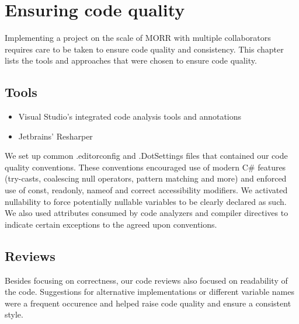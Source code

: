 \chapter{Ensuring code quality}

Implementing a project on the scale of MORR with multiple collaborators requires care to be taken to ensure code quality and consistency. This chapter lists the tools and approaches that were chosen to ensure code quality.

\section{Tools}

\begin{itemize}
    \item Visual Studio's integrated code analysis tools and annotations
    \item Jetbrains' Resharper
\end{itemize}

We set up common .editorconfig and .DotSettings files that contained our code quality conventions. These conventions encouraged use of modern C\# features (try-casts, coalescing null operators, pattern matching and more) and enforced use of const, readonly, nameof and correct accessibility modifiers. We activated nullability to force potentially nullable variables to be clearly declared as such. We also used attributes consumed by code analyzers and compiler directives to indicate certain exceptions to the agreed upon conventions.

\section{Reviews}

Besides focusing on correctness, our code reviews also focused on readability of the code. Suggestions for alternative implementations or different variable names were a frequent occurence and helped raise code quality and ensure a consistent style.